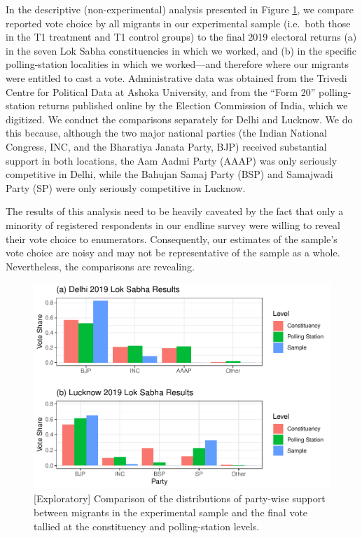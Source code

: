 \documentclass[
  11.5pt,
]{article}
\begin{document}
In the descriptive (non-experimental) analysis presented in Figure
\ref{fig:party_vote_comparison}, we compare reported vote choice by all
migrants in our experimental sample (i.e.~both those in the T1 treatment
and T1 control groups) to the final 2019 electoral returns (a) in the
seven Lok Sabha constituencies in which we worked, and (b) in the
specific polling-station localities in which we worked---and therefore
where our migrants were entitled to cast a vote. Administrative data was
obtained from the Trivedi Centre for Political Data at Ashoka
University, and from the ``Form 20'' polling-station returns published
online by the Election Commission of India, which we digitized. We
conduct the comparisons separately for Delhi and Lucknow. We do this
because, although the two major national parties (the Indian National
Congress, INC, and the Bharatiya Janata Party, BJP) received substantial
support in both locations, the Aam Aadmi Party (AAAP) was only seriously
competitive in Delhi, while the Bahujan Samaj Party (BSP) and Samajwadi
Party (SP) were only seriously competitive in Lucknow.

The results of this analysis need to be heavily caveated by the fact
that only a minority of registered respondents in our endline survey
were willing to reveal their vote choice to enumerators. Consequently,
our estimates of the sample's vote choice are noisy and may not be
representative of the sample as a whole. Nevertheless, the comparisons
are revealing.

\begin{figure}
\centering
\includegraphics{supplementary-information_files/figure-latex/unnamed-chunk-62-1.pdf}
\caption{\label{fig:party_vote_comparison}{[}Exploratory{]} Comparison
of the distributions of party-wise support between migrants in the
experimental sample and the final vote tallied at the constituency and
polling-station levels.}
\end{figure}
\end{document}
